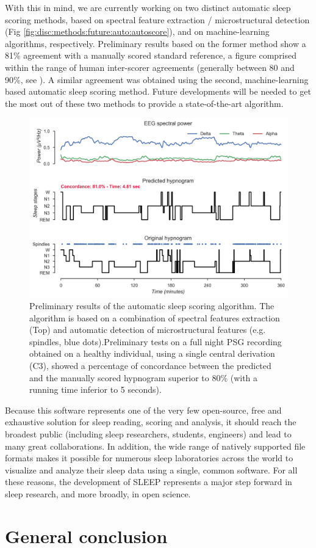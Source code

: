 With this in mind, we are currently working on two distinct automatic sleep scoring methods, based on spectral feature extraction / microstructural detection (Fig \ref{fig:disc:methods:future:auto:autoscore}), and on machine-learning algorithms, respectively. Preliminary results based on the former method show a 81\% agreement with a manually scored standard reference, a figure comprised within the range of human inter-scorer agreements (generally between 80 and 90\%, see \citealp{silber_visual_2007}). A similar agreement was obtained using the second, machine-learning based automatic sleep scoring method. Future developments will be needed to get the most out of these two methods to provide a state-of-the-art algorithm.

\begin{figure}[htb]
	\includegraphics[width=\textwidth]{Fig/Discussion/autoscore.png}
	\caption[Preliminary results of the automatic sleep scoring algorithm]{Preliminary results of the automatic sleep scoring algorithm. The algorithm is based on a combination of spectral features extraction (Top) and automatic detection of microstructural features (e.g. spindles, blue dots).Preliminary tests on a full night PSG recording obtained on a healthy individual, using a single central derivation (C3), showed a percentage of concordance between the predicted and the manually scored hypnogram superior to 80\% (with a running time inferior to 5 seconds).}
	\label{fig:disc:methods:future:autoscore}
\end{figure}

Because this software represents one of the very few open-source, free and exhaustive solution for sleep reading, scoring and analysis, it should reach the broadest public (including sleep researchers, students, engineers) and lead to many great collaborations. In addition, the wide range of natively supported file formats makes it possible for numerous sleep laboratories across the world to visualize and analyze their sleep data using a single, common software. For all these reasons, the development of SLEEP represents a major step forward in sleep research, and more broadly, in open science.


\cleardoublepage
\chapter{General conclusion}
\label{disc:conclusion}
